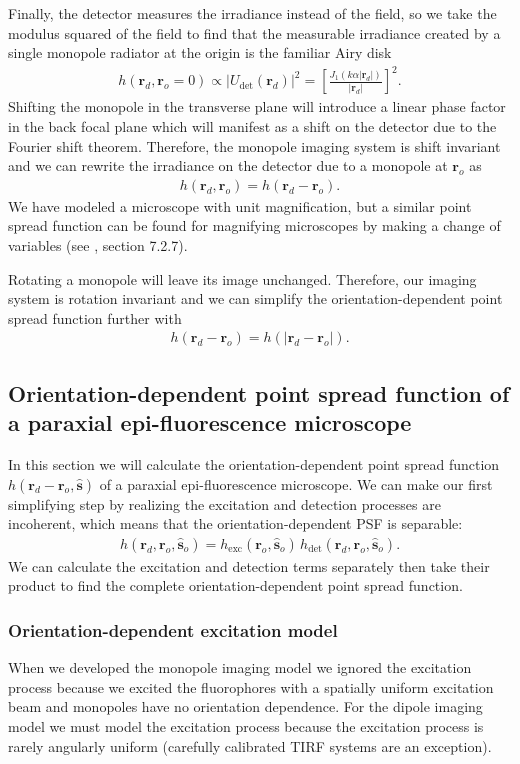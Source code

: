 \documentclass[]{osa-article}
\providecommand{\mb}[1]{\mathbf{#1}}
\providecommand{\ro}{\mathbf{\mathbf{r}}_o}
\providecommand{\so}{\mathbf{\hat{s}}_o}
\providecommand{\rd}{\mathbf{r}_d}
\providecommand{\mh}[1]{\mathbf{\hat{#1}}}
\begin{document}
Finally, the detector measures the irradiance instead of the field, so we take
the modulus squared of the field to find that the measurable irradiance created
by a single monopole radiator at the origin is the familiar Airy disk
\begin{align}
  h(\mb{r}_d, \ro = 0) \propto |U_{\text{det}}(\mb{r}_d)|^2 = \left[\frac{J_1(k\alpha|\mb{r}_d|)}{|\mb{r}_d|}\right]^2.
\end{align}
Shifting the monopole in the transverse plane will introduce a linear phase
factor in the back focal plane which will manifest as a shift on the detector
due to the Fourier shift theorem. Therefore, the monopole imaging system is
shift invariant and we can rewrite the irradiance on the detector due to a
monopole at $\ro$ as
\begin{align}
  h(\rd, \ro) = h(\rd - \ro). \label{eq:shift}
\end{align}
We have modeled a microscope with unit magnification, but a similar point spread
function can be found for magnifying microscopes by making a change of
variables (see \cite{barrett2004}, section 7.2.7).

Rotating a monopole will leave its image unchanged. Therefore, our imaging
system is rotation invariant and we can simplify the orientation-dependent point spread function further with
\begin{align}
  h(\rd - \ro) = h(|\rd - \ro|). \label{eq:rotational}
\end{align}

\subsection{Orientation-dependent point spread function of a paraxial epi-fluorescence microscope}
In this section we will calculate the orientation-dependent point spread
function $h(\rd - \ro, \mh{s})$ of a paraxial epi-fluorescence microscope. We can
make our first simplifying step by realizing the excitation and detection
processes are incoherent, which means that the orientation-dependent PSF is
separable:
\begin{align}
  h(\rd, \ro, \so) = h_{\text{exc}}(\ro, \so)\,h_{\text{det}}(\rd, \ro, \so). \label{eq:kernelsep}
\end{align}
We can calculate the excitation and detection terms separately then take their
product to find the complete orientation-dependent point spread function.

\subsubsection{Orientation-dependent excitation model}
When we developed the monopole imaging model we ignored the excitation process
because we excited the fluorophores with a spatially uniform excitation beam and
monopoles have no orientation dependence. For the dipole imaging model we must
model the excitation process because the excitation process is rarely angularly
uniform (carefully calibrated TIRF systems are an exception).
\end{document}
